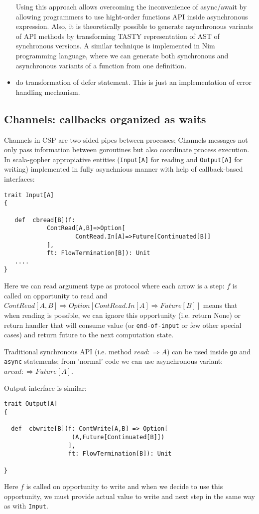 \documentclass[12pt]{article}
\newcommand{\To}{\Rightarrow}
\begin{document}
\begin{itemize}
 Using this approach allows overcoming the inconvenience of async/await by allowing programmers to use hight-order functions API inside asynchronous expression. Also, it is theoretically possible to generate asynchronous variants of API methods by transforming TASTY\cite{TASTY} representation of AST of synchronous versions. A similar technique is implemented in Nim \cite{Nim} programming language, where we can generate both synchronous and asynchronous variants of a function from one definition.
  
 \item do transformation of defer statement. This is just an implementation of error handling mechanism.

\end{itemize}

\subsection{Channels: callbacks organized as waits}

  Channels in CSP are two-sided pipes between processes; Channels messages not only pass information between goroutines but also coordinate process execution.
  In scala-gopher appropiative entities (\verb|Input[A]| for reading and \verb|Output[A]| for writing) implemented in fully asynchnious manner with help of callback-based interfaces:

\begin{Verbatim}[fontsize=\small]
trait Input[A]
{

   def  cbread[B](f:
            ContRead[A,B]=>Option[
                    ContRead.In[A]=>Future[Continuated[B]]
            ],
            ft: FlowTermination[B]): Unit
   ....
}
\end{Verbatim}

  Here we can read argument type as protocol where each arrow is a step: 
    $f$ is called on opportunity to read and
      $ContRead[A,B] \To Option[ContRead.In[A] \To Future[B]]$ means that when reading is 
   possible, we can ignore this opportunity (i.e. return None) or return handler that will
   consume value (or \verb|end-of-input| or few other special cases) and return future to the next 
   computation state.

  Traditional synchronous API  (i.e. method $read:\To A$) can be used inside \verb|go| and \verb|async| statements; from 'normal' code we can use asynchronous variant: $aread: \To Future[A]$.

  Output interface is similar:
\begin{Verbatim}[fontsize=\small]
trait Output[A] 
{

  def  cbwrite[B](f: ContWrite[A,B] => Option[
                   (A,Future[Continuated[B]])
                  ],
                  ft: FlowTermination[B]): Unit
  
}
\end{Verbatim}
  Here $f$ is called on opportunity to write and when we decide to use this opportunity, we
 must provide actual value to write and next step in the same way as with \verb|Input|.
\end{document}
